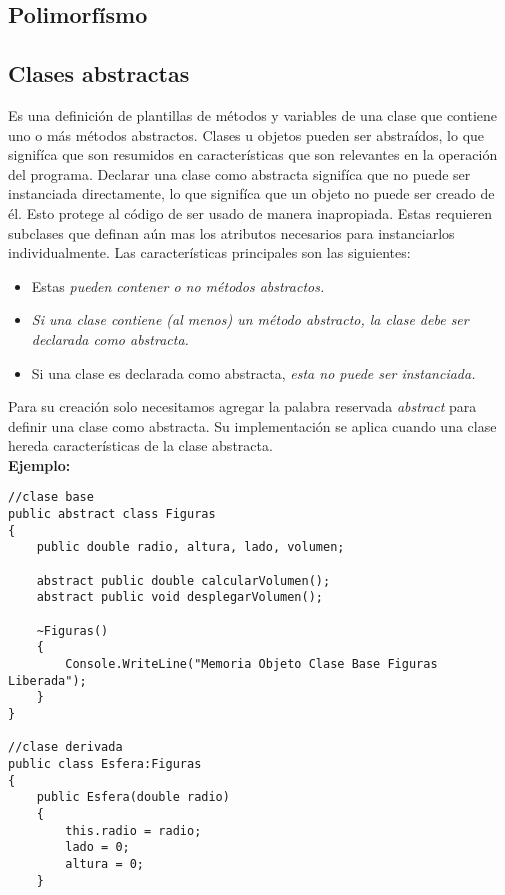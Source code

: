 \documentclass[letterpaper, 12pt]{article}
\begin{document}
    \newpage
    \begin{justify}
        \section{Polimorfísmo}
        \subsection{Clases abstractas}
        Es una definición de plantillas de métodos y variables de una clase que contiene uno o más métodos abstractos. Clases u objetos pueden ser abstraídos,
        lo que signifíca que son resumidos en características que son relevantes en la operación del programa. 
        Declarar una clase como abstracta signifíca que no puede ser instanciada directamente, lo que signifíca que un objeto no puede ser creado de él. Esto protege
        al código de ser usado de manera inapropiada. Estas requieren subclases que definan aún mas los atributos necesarios para instanciarlos individualmente.     
        Las características principales son las siguientes:
        \begin{itemize}
            \item Estas \emph{pueden contener o no métodos abstractos.}
            \item \emph{Si una clase contiene (al menos) un método abstracto, la clase debe ser declarada como abstracta.}
            \item Si una clase es declarada como abstracta, \emph{esta no puede ser instanciada.}
        \end{itemize}
        Para su creación solo necesitamos agregar la palabra reservada \emph{abstract} para definir una clase como abstracta. Su implementación se aplica cuando una
        clase hereda características de la clase abstracta.
        \newline
        \textbf{\\Ejemplo:}
            \begin{verbatim}
//clase base
public abstract class Figuras
{
    public double radio, altura, lado, volumen;

    abstract public double calcularVolumen();
    abstract public void desplegarVolumen();

    ~Figuras()
    {
        Console.WriteLine("Memoria Objeto Clase Base Figuras Liberada");
    }
}

//clase derivada
public class Esfera:Figuras
{
    public Esfera(double radio)
    {
        this.radio = radio;
        lado = 0;
        altura = 0;
    }


\end{verbatim}
\end{justify}
\end{document}
